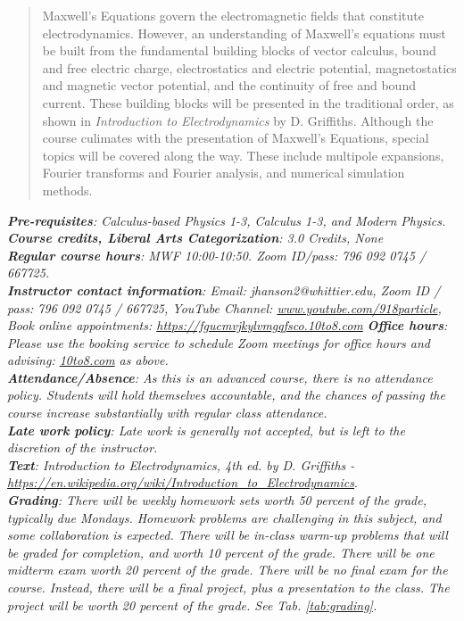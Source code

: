 \documentclass[10pt]{article}
\begin{document}
\maketitle

\begin{abstract}
Maxwell's Equations govern the electromagnetic fields that constitute electrodynamics.  However, an understanding of Maxwell's equations must be built from the fundamental building blocks of vector calculus, bound and free electric charge, electrostatics and electric potential, magnetostatics and magnetic vector potential, and the continuity of free and bound current.  These building blocks will be presented in the traditional order, as shown in \textit{Introduction to Electrodynamics} by D. Griffiths.  Although the course culimates with the presentation of Maxwell's Equations, special topics will be covered along the way.  These include multipole expansions, Fourier transforms and Fourier analysis, and numerical simulation methods.  
\end{abstract}
\noindent
\textit{\textbf{Pre-requisites}:  Calculus-based Physics 1-3, Calculus 1-3, and Modern Physics.} \\
\textit{\textbf{Course credits, Liberal Arts Categorization}: 3.0 Credits, None} \\
\textit{\textbf{Regular course hours}: MWF 10:00-10:50.  \textit{Zoom ID/pass}: 796 092 0745 / 667725. } \\
\textit{\textbf{Instructor contact information}: Email: jhanson2@whittier.edu, Zoom ID / pass: 796 092 0745 / 667725, YouTube Channel: \url{www.youtube.com/918particle}, Book online appointments: \url{https://fgucmvjkylvmgqfsco.10to8.com}}
\textit{\textbf{Office hours}: Please use the booking service to schedule Zoom meetings for office hours and advising: \url{10to8.com} as above.} \\
\textit{\textbf{Attendance/Absence}: As this is an advanced course, there is no attendance policy. Students will hold themselves accountable, and the chances of passing the course increase substantially with regular class attendance.} \\ 
\textit{\textbf{Late work policy}: Late work is generally not accepted, but is left to the discretion of the instructor.} \\
\textit{\textbf{Text}: Introduction to Electrodynamics, 4th ed. by D. Griffiths - \url{https://en.wikipedia.org/wiki/Introduction_to_Electrodynamics}}. \\
\textit{\textbf{Grading}: There will be weekly homework sets worth 50 percent of the grade, typically due Mondays.  Homework problems are challenging in this subject, and some collaboration is expected.  There will be in-class warm-up problems that will be graded for completion, and worth 10 percent of the grade.  There will be one midterm exam worth 20 percent of the grade.  There will be no final exam for the course.  Instead, there will be a final project, plus a presentation to the class.  The project will be worth 20 percent of the grade.  See Tab. \ref{tab:grading}.}
\end{document}
